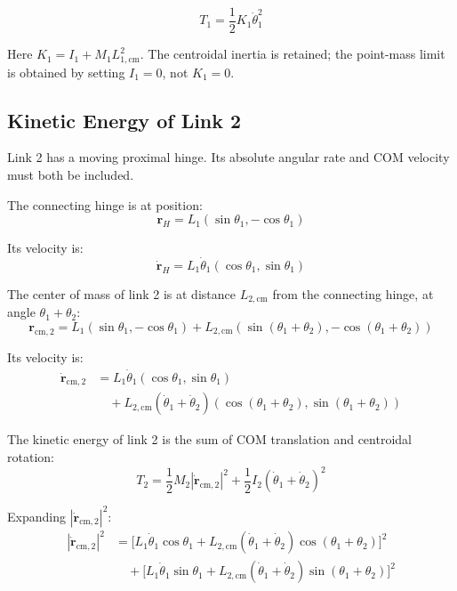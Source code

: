 \begin{equation}
T_1 = \frac{1}{2} K_1 \dot{\theta}_1^2
\label{eq:ch03_T1}
\end{equation}

Here $K_1=I_1+M_1L_{1,\mathrm{cm}}^2$. The centroidal inertia is retained; the point-mass limit is obtained by setting $I_1=0$, not $K_1=0$.

\subsection*{Kinetic Energy of Link 2}

Link 2 has a moving proximal hinge. Its absolute angular rate and COM velocity must both be included.

The connecting hinge is at position:
\begin{equation}
\bm{r}_{H} = L_1 (\sin \theta_1, -\cos \theta_1)
\label{eq:ch03_elbow_pos}
\end{equation}

Its velocity is:
\begin{equation}
\dot{\bm{r}}_{H} = L_1 \dot{\theta}_1 (\cos \theta_1, \sin \theta_1)
\label{eq:ch03_elbow_vel}
\end{equation}

The center of mass of link 2 is at distance $L_{2,\text{cm}}$ from the connecting hinge, at angle $\theta_1 + \theta_2$:
\begin{equation}
\bm{r}_{\text{cm},2} = L_1 (\sin \theta_1, -\cos \theta_1) + L_{2,\text{cm}} (\sin(\theta_1 + \theta_2), -\cos(\theta_1 + \theta_2))
\label{eq:ch03_cm2_pos}
\end{equation}

Its velocity is:
\begin{align}
\dot{\bm{r}}_{\text{cm},2} &= L_1 \dot{\theta}_1 (\cos \theta_1, \sin \theta_1) \\
&\quad + L_{2,\text{cm}} (\dot{\theta}_1 + \dot{\theta}_2) (\cos(\theta_1 + \theta_2), \sin(\theta_1 + \theta_2))
\label{eq:ch03_cm2_vel}
\end{align}

The kinetic energy of link 2 is the sum of COM translation and centroidal rotation:
\begin{equation}
T_2 = \frac{1}{2} M_2 |\dot{\bm{r}}_{\text{cm},2}|^2 + \frac12 I_2(\dot\theta_1+\dot\theta_2)^2
\label{eq:ch03_T2_general}
\end{equation}

Expanding $|\dot{\bm{r}}_{\text{cm},2}|^2$:
\begin{align}
|\dot{\bm{r}}_{\text{cm},2}|^2 &= \big[ L_1 \dot{\theta}_1 \cos \theta_1 + L_{2,\text{cm}} (\dot{\theta}_1 + \dot{\theta}_2) \cos(\theta_1 + \theta_2) \big]^2 \\
&\quad + \big[ L_1 \dot{\theta}_1 \sin \theta_1 + L_{2,\text{cm}} (\dot{\theta}_1 + \dot{\theta}_2) \sin(\theta_1 + \theta_2) \big]^2
\end{align}

